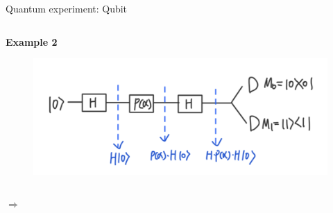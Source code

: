 \documentclass[9pt]{beamer}
\begin{document}
\begin{section}{Quantum experiment: Qubit}
\begin{frame}
\begin{columns}
                \begin{column}{0.6\textwidth}
                    \textbf{Example 2}
                    \begin{figure}
                        \includegraphics[width=0.8\columnwidth]{image/L1_ex2.png}
                    \end{figure}

                \end{column}
            \end{columns}
            \vspace{0.8cm}
            $\Rightarrow$
            \vspace{2cm}
        \end{frame}
    \end{section}
\end{document}
